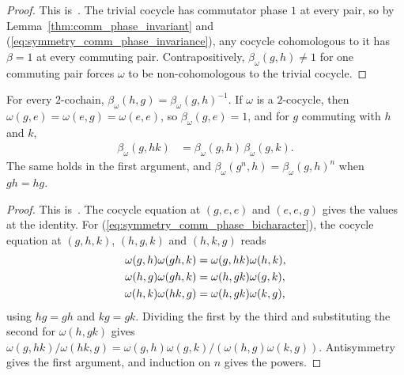 \begin{proof}\leanok{}
    This is~\cite[``Commutator-phase non-triviality
        test'']{QICLean2026Blueprint}.
    The trivial cocycle has commutator phase $1$ at every pair, so by
    Lemma~\ref{thm:comm_phase_invariant} and
    (\ref{eq:symmetry_comm_phase_invariance}), any cocycle cohomologous to it
    has $\beta=1$ at every commuting pair. Contrapositively,
    $\beta_\omega(g,h)\neq 1$ for one commuting pair forces $\omega$ to be
    non-cohomologous to the trivial cocycle.
\end{proof}

\begin{lemma}
    \label{thm:comm_phase_bicharacter}
    \leanok
    For every $2$-cochain, $\beta_\omega(h,g)=\beta_\omega(g,h)^{-1}$. If
    $\omega$ is a $2$-cocycle, then $\omega(g,e)=\omega(e,g)=\omega(e,e)$, so
    $\beta_\omega(g,e)=1$, and for $g$ commuting with $h$ and $k$,
    \begin{align}
        \beta_\omega(g,hk) & =\beta_\omega(g,h)\,\beta_\omega(g,k).
        \label{eq:symmetry_comm_phase_bicharacter}
    \end{align}
    The same holds in the first argument, and
    $\beta_\omega(g^n,h)=\beta_\omega(g,h)^n$ when $gh=hg$.
\end{lemma}

\begin{proof}\leanok
    This is~\cite[``The commutator phase of a cocycle is a
        bicharacter'']{QICLean2026Blueprint}.
    The cocycle equation at $(g,e,e)$ and $(e,e,g)$ gives the values at the
    identity. For (\ref{eq:symmetry_comm_phase_bicharacter}), the cocycle
    equation at $(g,h,k)$, $(h,g,k)$ and $(h,k,g)$ reads
    \begin{align}
        \omega(g,h)\omega(gh,k) & =\omega(g,hk)\omega(h,k),
        \notag                                              \\
        \omega(h,g)\omega(gh,k) & =\omega(h,gk)\omega(g,k),
        \notag                                              \\
        \omega(h,k)\omega(hk,g) & =\omega(h,gk)\omega(k,g),
        \notag
    \end{align}
    using $hg=gh$ and $kg=gk$. Dividing the first by the third and
    substituting the second for $\omega(h,gk)$ gives
    $\omega(g,hk)/\omega(hk,g)
        =\omega(g,h)\omega(g,k)/(\omega(h,g)\omega(k,g))$. Antisymmetry gives
    the first argument, and induction on $n$ gives the powers.
\end{proof}
